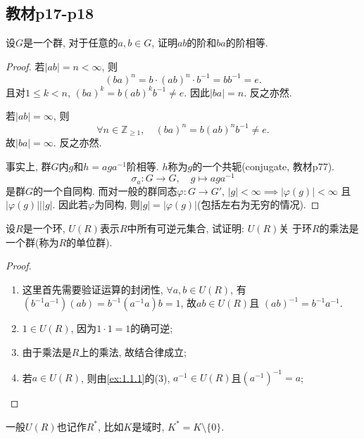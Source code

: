 \subsection{教材p17-p18}

\begin{problem}\label{ex:1.3.1}
    设$G$是一个群, 对于任意的$a, b \in G$, 证明$ab$的阶和$ba$的阶相等.
\end{problem}

\begin{proof}
    若$|ab| = n < \infty$, 则
\[
    (ba)^n = b \cdot (ab)^n \cdot b^{-1} = bb^{-1} = e.
\] 
    且对$1 \leqslant k < n$, $(ba)^k = b(ab)^kb^{-1} \neq e$.
因此$|ba| = n$. 反之亦然.
    
    若$|ab| = \infty$, 则
\[
    \forall n \in \mathbb{Z}_{\geqslant 1}, \quad (ba)^n = b(ab)^nb^{-1} \neq e.
\]
    故$|ba| = \infty$. 反之亦然.

    事实上, 群$G$内$g$和$h = aga^{-1}$阶相等. $h$称为$g$的一个共轭(conjugate, 教材p77).
\[
    \sigma_a: G \to G, \quad g \mapsto aga^{-1}
\]
是群$G$的一个自同构. 而对一般的群同态$\varphi: G \to G'$, $|g| < \infty \implies |\varphi(g)| < \infty$
且$|\varphi(g)| \Big| |g|$. 因此若$\varphi$为同构, 则$|g| = |\varphi(g)|$(包括左右为无穷的情况).
\end{proof}

\begin{problem}\label{ex:1.3.2}
    设$R$是一个环, $U(R)$表示$R$中所有可逆元集合, 试证明: $U(R)$关
于环$R$的乘法是一个群(称为$R$的单位群).
\end{problem}

\begin{proof}
    \begin{enumerate}[(1)]
        \item 这里首先需要验证运算的封闭性, $\forall a, b \in U(R)$, 有
    $(b^{-1}a^{-1})(ab) = b^{-1}(a^{-1}a)b = 1$, 故$ab \in U(R)$且
    $(ab)^{-1} = b^{-1}a^{-1}$.
        \item $1 \in U(R)$, 因为$1 \cdot 1 = 1$的确可逆;
        \item 由于乘法是$R$上的乘法, 故结合律成立;
        \item 若$a \in U(R)$, 则由\ref{ex:1.1.1}的(3), $a^{-1} \in U(R)$且$(a^{-1})^{-1} = a$;
    \end{enumerate}
\end{proof}

\begin{remark}
    一般$U(R)$也记作$R^*$, 比如$K$是域时, $K^* = K \setminus \{0\}$.
\end{remark}

